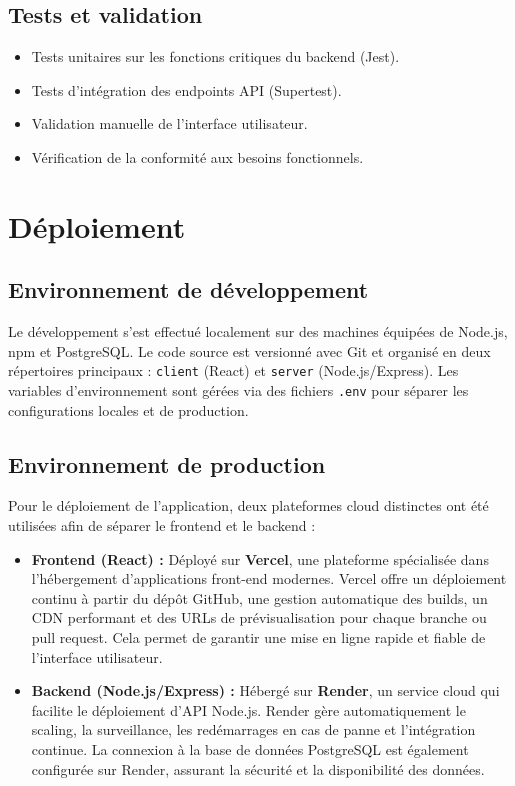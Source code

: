 \documentclass[12pt,a4paper]{report}
\begin{document}
\section{Tests et validation}

\begin{itemize}
    \item Tests unitaires sur les fonctions critiques du backend (Jest).
    \item Tests d’intégration des endpoints API (Supertest).
    \item Validation manuelle de l’interface utilisateur.
    \item Vérification de la conformité aux besoins fonctionnels.
\end{itemize}

\chapter{Déploiement}
\section{Environnement de développement}

Le développement s’est effectué localement sur des machines équipées de Node.js, npm et PostgreSQL. Le code source est versionné avec Git et organisé en deux répertoires principaux : \texttt{client} (React) et \texttt{server} (Node.js/Express). Les variables d’environnement sont gérées via des fichiers \texttt{.env} pour séparer les configurations locales et de production.

\section{Environnement de production}

Pour le déploiement de l’application, deux plateformes cloud distinctes ont été utilisées afin de séparer le frontend et le backend :

\begin{itemize}
    \item \textbf{Frontend (React) :} Déployé sur \textbf{Vercel}, une plateforme spécialisée dans l’hébergement d’applications front-end modernes. Vercel offre un déploiement continu à partir du dépôt GitHub, une gestion automatique des builds, un CDN performant et des URLs de prévisualisation pour chaque branche ou pull request. Cela permet de garantir une mise en ligne rapide et fiable de l’interface utilisateur.
    \item \textbf{Backend (Node.js/Express) :} Hébergé sur \textbf{Render}, un service cloud qui facilite le déploiement d’API Node.js. Render gère automatiquement le scaling, la surveillance, les redémarrages en cas de panne et l’intégration continue. La connexion à la base de données PostgreSQL est également configurée sur Render, assurant la sécurité et la disponibilité des données.
\end{itemize}
\end{document}
